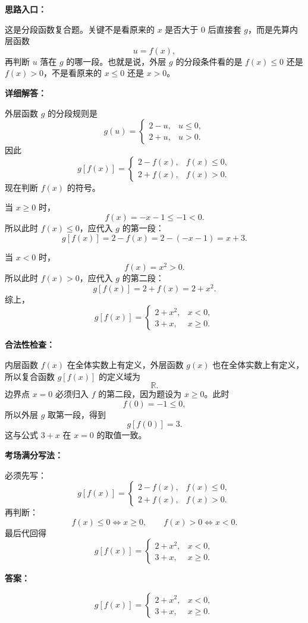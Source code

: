 \begin{solutionBox}
\textbf{思路入口：}

这是分段函数复合题。关键不是看原来的 \(x\) 是否大于 \(0\) 后直接套 \(g\)，而是先算内层函数
\[
u=f(x),
\]
再判断 \(u\) 落在 \(g\) 的哪一段。也就是说，外层 \(g\) 的分段条件看的是 \(f(x)\le 0\) 还是 \(f(x)>0\)，不是看原来的 \(x\le 0\) 还是 \(x>0\)。

\textbf{详细解答：}

外层函数 \(g\) 的分段规则是
\[
g(u)=
\begin{cases}
2-u, & u\le 0,\\
2+u, & u>0.
\end{cases}
\]
因此
\[
g[f(x)]=
\begin{cases}
2-f(x), & f(x)\le 0,\\
2+f(x), & f(x)>0.
\end{cases}
\]
现在判断 \(f(x)\) 的符号。

当 \(x\ge 0\) 时，
\[
f(x)=-x-1\le -1<0.
\]
所以此时 \(f(x)\le 0\)，应代入 \(g\) 的第一段：
\[
g[f(x)]=2-f(x)=2-(-x-1)=x+3.
\]

当 \(x<0\) 时，
\[
f(x)=x^2>0.
\]
所以此时 \(f(x)>0\)，应代入 \(g\) 的第二段：
\[
g[f(x)]=2+f(x)=2+x^2.
\]
综上，
\[
g[f(x)]=
\begin{cases}
2+x^2, & x<0,\\
3+x, & x\ge 0.
\end{cases}
\]

\textbf{合法性检查：}

内层函数 \(f(x)\) 在全体实数上有定义，外层函数 \(g(x)\) 也在全体实数上有定义，所以复合函数 \(g[f(x)]\) 的定义域为
\[
\mathbb{R}.
\]
边界点 \(x=0\) 必须归入 \(f\) 的第二段，因为题设为 \(x\ge 0\)。此时
\[
f(0)=-1\le 0,
\]
所以外层 \(g\) 取第一段，得到
\[
g[f(0)]=3.
\]
这与公式 \(3+x\) 在 \(x=0\) 的取值一致。

\textbf{考场满分写法：}

必须先写：
\[
g[f(x)]=
\begin{cases}
2-f(x), & f(x)\le 0,\\
2+f(x), & f(x)>0.
\end{cases}
\]
再判断：
\[
f(x)\le 0\Longleftrightarrow x\ge 0,\qquad
f(x)>0\Longleftrightarrow x<0.
\]
最后代回得
\[
g[f(x)]=
\begin{cases}
2+x^2, & x<0,\\
3+x, & x\ge 0.
\end{cases}
\]

\textbf{答案：}

\[
\boxed{
g[f(x)]=
\begin{cases}
2+x^2, & x<0,\\
3+x, & x\ge 0.
\end{cases}}
\]
\end{solutionBox}

